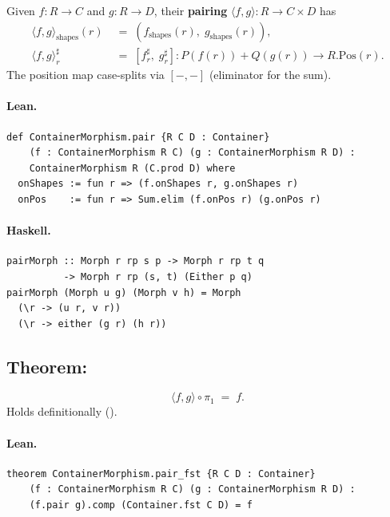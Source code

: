 \documentclass[11pt,a4paper]{article}
\begin{document}
\begin{defn}[Pairing]
Given $f : R \to C$ and $g : R \to D$, their \textbf{pairing}
$\langle f, g \rangle : R \to C \times D$ has
\begin{align*}
  \langle f, g \rangle_{\text{shapes}}(r)
    &\;=\; (f_{\text{shapes}}(r),\; g_{\text{shapes}}(r)), \\
  \langle f, g \rangle^\sharp_r
    &\;=\; [f^\sharp_r,\; g^\sharp_r]
      : P(f(r)) + Q(g(r)) \to R.\mathrm{Pos}(r).
\end{align*}
The position map case-splits via $[-, -]$ (eliminator for the sum).
\end{defn}

\paragraph{Lean.}
\begin{lstlisting}[style=lean]
def ContainerMorphism.pair {R C D : Container}
    (f : ContainerMorphism R C) (g : ContainerMorphism R D) :
    ContainerMorphism R (C.prod D) where
  onShapes := fun r => (f.onShapes r, g.onShapes r)
  onPos    := fun r => Sum.elim (f.onPos r) (g.onPos r)
\end{lstlisting}

\paragraph{Haskell.}
\begin{lstlisting}[style=haskell]
pairMorph :: Morph r rp s p -> Morph r rp t q
          -> Morph r rp (s, t) (Either p q)
pairMorph (Morph u g) (Morph v h) = Morph
  (\r -> (u r, v r))
  (\r -> either (g r) (h r))
\end{lstlisting}


\subsection{Theorem: }

\begin{thm}
\[
  \langle f, g \rangle \circ \pi_1 \;=\; f.
\]
Holds definitionally ().
\end{thm}

\paragraph{Lean.}
\begin{lstlisting}[style=lean]
theorem ContainerMorphism.pair_fst {R C D : Container}
    (f : ContainerMorphism R C) (g : ContainerMorphism R D) :
    (f.pair g).comp (Container.fst C D) = f
\end{lstlisting}
\end{document}
